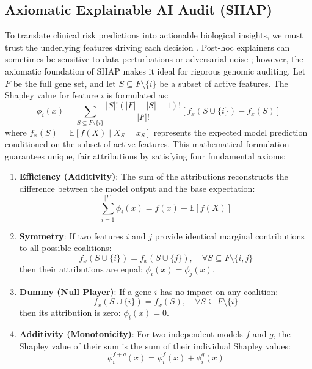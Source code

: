 \documentclass[11pt]{article}
\begin{document}
\subsection{Axiomatic Explainable AI Audit (SHAP)}
To translate clinical risk predictions into actionable biological insights, we must trust the underlying features driving each decision \citep{arrieta2020explainable, molnar2020interpretable}. Post-hoc explainers can sometimes be sensitive to data perturbations or adversarial noise \citep{slack2020fooling, adebayo2018sanity}; however, the axiomatic foundation of SHAP \citep{lundberg2017unified} makes it ideal for rigorous genomic auditing. Let $F$ be the full gene set, and let $S \subseteq F \setminus \{i\}$ be a subset of active features. The Shapley value for feature $i$ is formulated as:
\begin{equation}
\phi_i(x) = \sum_{S \subseteq F \setminus \{i\}} \frac{|S|!(|F| - |S| - 1)!}{|F|!} \left[ f_x(S \cup \{i\}) - f_x(S) \right]
\end{equation}
where $f_x(S) = \mathbb{E}[f(X) \mid X_S = x_S]$ represents the expected model prediction conditioned on the subset of active features. This mathematical formulation guarantees unique, fair attributions by satisfying four fundamental axioms:
\begin{enumerate}
    \item \textbf{Efficiency (Additivity)}: The sum of the attributions reconstructs the difference between the model output and the base expectation:
    \begin{equation}
    \sum_{i=1}^{|F|} \phi_i(x) = f(x) - \mathbb{E}[f(X)]
    \end{equation}
    \item \textbf{Symmetry}: If two features $i$ and $j$ provide identical marginal contributions to all possible coalitions:
    \begin{equation}
    f_x(S \cup \{i\}) = f_x(S \cup \{j\}), \quad \forall S \subseteq F \setminus \{i,j\}
    \end{equation}
    then their attributions are equal: $\phi_i(x) = \phi_j(x)$.
    \item \textbf{Dummy (Null Player)}: If a gene $i$ has no impact on any coalition:
    \begin{equation}
    f_x(S \cup \{i\}) = f_x(S), \quad \forall S \subseteq F \setminus \{i\}
    \end{equation}
    then its attribution is zero: $\phi_i(x) = 0$.
    \item \textbf{Additivity (Monotonicity)}: For two independent models $f$ and $g$, the Shapley value of their sum is the sum of their individual Shapley values:
    \begin{equation}
    \phi_i^{f+g}(x) = \phi_i^f(x) + \phi_i^g(x)
    \end{equation}
\end{enumerate}
\end{document}
